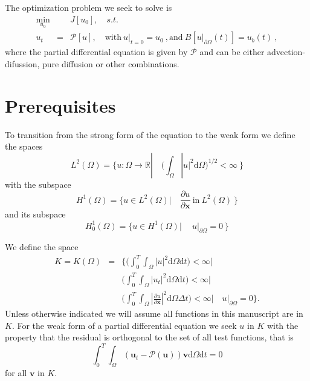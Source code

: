 \documentclass[10pt]{article}
\renewcommand{\d}{\mathrm{d}}
\newcommand{\vect}[1]{\mathbf{#1} }
\newcommand{\dt}{\Delta t}
\begin{document}
The optimization problem we seek to solve is
\begin{eqnarray}
\min_{u_0} &&J[u_0], \quad s.t. \\ \nonumber
u_t&=&\mathcal{P}[u], \quad \text{with}\ u|_{t=0}=u_0\ , \text{and} \  B[u|_{\partial \Omega}(t)]= u_b(t)\ ,
\label{optimizationproblem}
\end{eqnarray}
where the partial differential equation is given by $\mathcal P$ and can be either advection-difussion, pure diffusion or other combinations.

\section{Prerequisites}

To transition from the strong form of the equation to the weak form we define the spaces
$$
L^2(\Omega)=\lbrace u :\Omega\rightarrow \mathbb R |\quad \bigg(\int_{\Omega} |u|^2 \d \Omega \bigg)^{1/2}<\infty\ \rbrace
$$
with the subspace
$$
H^1(\Omega)=\lbrace u \in L^2(\Omega) |\quad \frac{\partial u}{\partial \vect x} \ \text{in}\  L^2(\Omega)\ \rbrace
$$
and its subspace
$$
H^1_0(\Omega)=\lbrace u \in H^1(\Omega) |\quad \ u|_{\partial\Omega}=0 \ \rbrace
$$

We define the space
\begin{eqnarray*}
K  =   K (\Omega) & = & \lbrace \bigg(\int_0^T \int_{\Omega} |u|^2 \d \Omega \d t \bigg) < \infty | \\
                  &   &  \bigg(\int_0^T \int_{\Omega} |u_t|^2 \d \Omega \d t \bigg) < \infty | \\
                  &   &  \bigg(\int_0^T \int_{\Omega} |\frac{\partial u}{\partial \vect x}|^2 \d \Omega \dt \bigg) < \infty | \quad  u|_{\partial\Omega}=0 \rbrace.
\end{eqnarray*}
Unless otherwise indicated we will assume all functions in this manuscript are in $K$.
For the weak form of a partial differential equation we seek $ u $ in $K$ with the property that the residual is orthogonal to the set of all test functions,
that is
\[
\int_0^T \int_{\Omega} (\mathbf u_t-\mathcal P(\vect u)) \mathbf v \d \Omega \d t = 0
\]
for all $\mathbf v$ in $K$.
\end{document}
